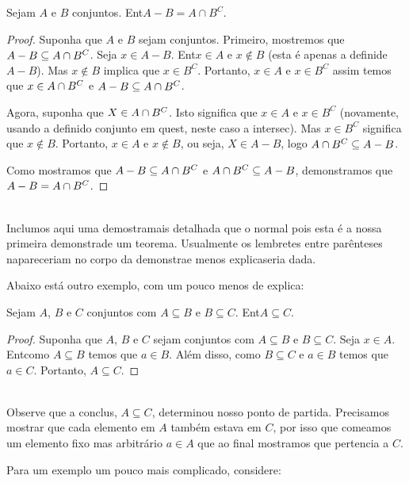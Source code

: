 \begin{teob}
Sejam $A$ e $B$ conjuntos. Ent\ao $A-B=A\cap B^C.$
\end{teob}
\begin{proof} Suponha que $A$ e $B$ sejam conjuntos. Primeiro, mostremos que $A-B\subseteq A\cap B^C$. Seja $x \in A-B$. Ent\ao $x\in A$ e $x\notin B$ (esta \'e apenas a defini\cao de $A-B$). Mas $x\notin B$ implica que $x\in B^C$. Portanto, $x\in A$ e $x\in B^C$ assim temos que $x\in A\cap B^C$ e $A-B\subseteq A\cap B^C$.

Agora, suponha que $X\in A\cap B^C$. Isto significa que $x\in A$ e $x\in B^C$ (novamente, usando a defini\cao do conjunto em quest\aoi, neste caso a intersec\caoi). Mas $x\in B^C$ significa que $x\notin B$. Portanto, $x\in A$ e $x\notin B$, ou seja, $X\in A-B$, logo $A\cap B^C\subseteq A-B$.

Como mostramos que $A-B\subseteq A\cap B^C$ e $A\cap B^C\subseteq A-B$, demonstramos que $A-B= A\cap B^C$. 
\end{proof}
\\

Inclu\ih mos aqui uma demostra\cao mais detalhada que o normal pois esta \'e a nossa primeira demonstra\cao de um teorema. Usualmente os lembretes entre par\^enteses n\ao apareceriam no corpo da demonstra\cao e menos explica\cao seria dada.

Abaixo est\'a outro exemplo, com um pouco menos de explica\caoi:

\begin{teob}
Sejam $A$, $B$ e $C$ conjuntos com $A\subseteq B$ e $B\subseteq C$. Ent\ao $A\subseteq C.$
\end{teob}
\begin{proof} 
Suponha que $A$, $B$ e $C$ sejam conjuntos com $A\subseteq B$ e $B\subseteq C$. Seja $x\in A$. Ent\ao como $A\subseteq B$ temos que $a\in B$. Al\'em disso, como $B\subseteq C$ e $a\in B$ temos que $a\in C$. Portanto, $A\subseteq C$.
\end{proof}
\\

Observe que a conclus\aoi, $A\subseteq C$, determinou nosso ponto de partida. Precisamos mostrar que cada elemento em $A$ tamb\'em estava em $C$, por isso que come\cc amos um elemento fixo mas arbitr\'ario $a\in A$ que ao final mostramos que pertencia a $C$.

Para um exemplo um pouco mais complicado, considere:

